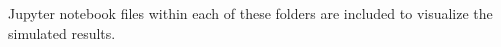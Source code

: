 \documentclass{article}
\newcommand{\code}[1]{\texttt{#1}}
\begin{document}
Jupyter notebook files within each of these folders are included to visualize the simulated results.




%
%
% 
\end{document}

